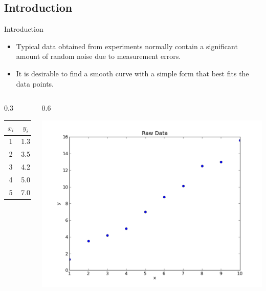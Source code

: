 \documentclass{beamer}
\begin{document}
\subsection{Introduction}
\begin{frame}{Introduction}
\begin{itemize}
\item Typical data obtained from experiments normally contain a significant amount of random noise due to measurement errors. 
\item It is desirable to find a smooth curve with a simple form that \alert{best} fits the data points. 
\end{itemize}
\begin{columns}
\begin{column}[b]{0.3\textwidth}
\begin{center}
\begin{tabular}{cc|cc}
\hline
$x_i$ & $y_i$ & $x_i$ & $y_i$
\\\hline
1 & 1.3 & 6 & 8.8\\
2 & 3.5 & 7 & 10.1 \\
3 & 4.2 & 8 & 12.5\\
4 & 5.0 & 9 & 13.0 \\
5 & 7.0 & 10 & 15.6\\
\hline
\end{tabular}
\end{center}
\end{column}
\begin{column}{0.6\textwidth}
\centerline{\includegraphics[width=\textwidth]{Lec11_fig1.pdf}}
\end{column}
\end{columns}
\end{frame}
\end{document}

